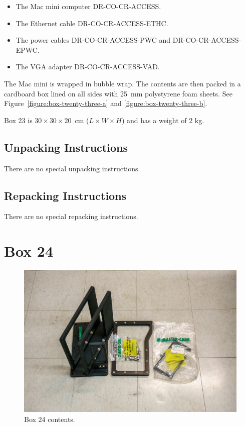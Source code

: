 \documentclass{article}
\begin{document}
\begin{itemize}
    \item The Mac mini computer DR-CO-CR-ACCESS.
    \item The Ethernet cable DR-CO-CR-ACCESS-ETHC.
    \item The power cables DR-CO-CR-ACCESS-PWC and DR-CO-CR-ACCESS-EPWC.
    \item The VGA adapter DR-CO-CR-ACCESS-VAD.
\end{itemize}

The Mac mini is wrapped in bubble wrap. The contents are then packed in a cardboard box lined on all sides with 25~mm polystyrene foam sheets. See Figure~\ref{figure:box-twenty-three-a} and \ref{figure:box-twenty-three-b}.

Box 23 is  $30 \times 30 \times 20$~cm ($L \times W \times H$) and has a weight of 2 kg.

\subsection{Unpacking Instructions}

There are no special unpacking instructions.

\subsection{Repacking Instructions}

There are no special repacking instructions.


\clearpage
\section{Box 24}

\begin{figure}[bp]
\begin{center}
\includegraphics[width=0.80\linewidth]{figures/20201208T180354.jpg}
\end{center}
\caption{Box 24 contents.}
\label{figure:box-twenty-four-a}
\end{figure}
\end{document}
